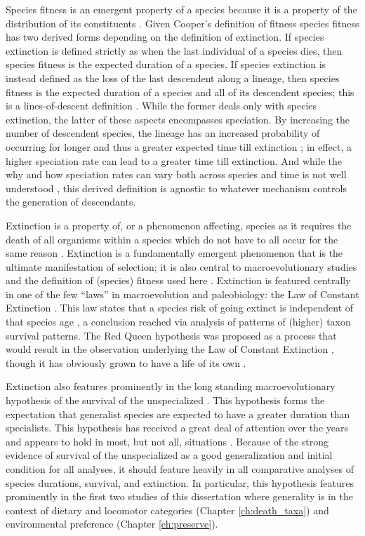 Species fitness is an emergent property of a species because it is a property of the distribution of its constituents \citep{Jablonski2007}. Given Cooper's definition of fitness \citep{Cooper1984} species fitness has two derived forms depending on the definition of extinction. If species extinction is defined strictly as when the last individual of a species dies, then species fitness is the expected duration of a species. If species extinction is instead defined as the loss of the last descendent along a lineage, then species fitness is the expected duration of a species and all of its descendent species; this is a lines-of-descent definition \citep{Cooper1984}. While the former deals only with species extinction, the latter of these aspects encompasses speciation. By increasing the number of descendent species, the lineage has an increased probability of occurring for longer and thus a greater expected time till extinction \citep{Cooper1984}; in effect, a higher speciation rate can lead to a greater time till extinction. And while the why and how speciation rates can vary both across species and time is not well understood \citep{Rabosky2015c,Rabosky2013e,Coyne2004}, this derived definition is agnostic to whatever mechanism controls the generation of descendants. 

Extinction is a property of, or a phenomenon affecting, species as it requires the death of all organisms within a species which do not have to all occur for the same reason \citep{Simpson2016a}. Extinction is a fundamentally emergent phenomenon that is the ultimate manifestation of selection; it is also central to macroevolutionary studies and the definition of (species) fitness used here \citep{Cooper1984}. Extinction is featured centrally in one of the few ``laws'' in macroevolution and paleobiology: the Law of Constant Extinction \citep{VanValen1973,Liow2011a}. This law states that a species risk of going extinct is independent of that species age \citep{VanValen1973,Liow2011a}, a conclusion reached via analysis of patterns of (higher) taxon survival patterns. The Red Queen hypothesis was proposed as a process that would result in the observation underlying the Law of Constant Extinction \citep{VanValen1973}, though it has obviously grown to have a life of its own \citep{Liow2011a}.

Extinction also features prominently in the long standing macroevolutionary hypothesis of the survival of the unspecialized \citep{Simpson1944}. This hypothesis forms the expectation that generalist species are expected to have a greater duration than specialists. This hypothesis has received a great deal of attention over the years and appears to hold in most, but not all, situations \citep{Simpson1944,Liow2004a,Nurnberg2013a,Nurnberg2015,Baumiller1993,Raia2016}. Because of the strong evidence of survival of the unspecialized as a good generalization and initial condition for all analyses, it should feature heavily in all comparative analyses of species durations, survival, and extinction. In particular, this hypothesis features prominently in the first two studies of this dissertation where generality is in the context of dietary and locomotor categories (Chapter \ref{ch:death_taxa}) and environmental preference (Chapter \ref{ch:preserve}). 

